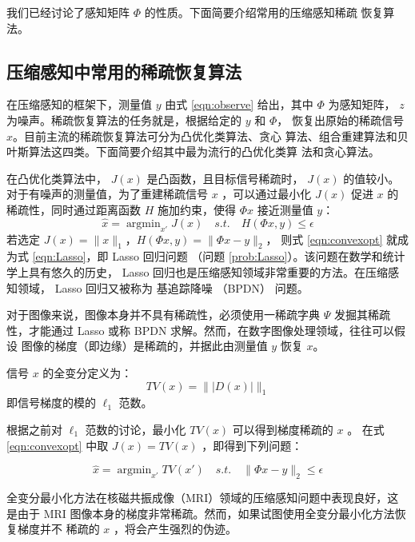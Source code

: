 我们已经讨论了感知矩阵 $\Phi$ 的性质。下面简要介绍常用的压缩感知稀疏
恢复算法。

\subsection{压缩感知中常用的稀疏恢复算法}

在压缩感知的框架下，测量值 $y$ 由式 \ref{eqn:observe} 给出，其中 $\Phi$
为感知矩阵， $z$ 为噪声。稀疏恢复算法的任务就是，根据给定的 $y$ 和 $\Phi$，
恢复出原始的稀疏信号 $x$。目前主流的稀疏恢复算法可分为凸优化类算法、贪心
算法、组合重建算法和贝叶斯算法这四类。下面简要介绍其中最为流行的凸优化类算
法和贪心算法。

在凸优化类算法中， $J(x)$ 是凸函数，且目标信号稀疏时， $J(x)$
的值较小。对于有噪声的测量值，为了重建稀疏信号 $x$ ，可以通过最小化 $J(x)$
促进 $x$ 的稀疏性，同时通过距离函数 $H$ 施加约束，使得 $\Phi x$ 接近测量值
$y$：
\begin{equation} \label{eqn:convexopt}
\hat x = \mathop{\arg \min}_{x'} J(x) \quad s.t. \quad H(\Phi x, y) \leq
\epsilon
\end{equation}
若选定 $J(x) = \|x\|_1$，$H(\Phi x, y) = \|\Phi x - y\|_2$，
则式 \ref{eqn:convexopt} 就成为式 \ref{eqn:Lasso}，即 Lasso 回归问题
（问题 \ref{prob:Lasso}）。该问题在数学和统计学上具有悠久的历史， Lasso
回归也是压缩感知领域非常重要的方法。在压缩感知领域， Lasso 回归又被称为
基追踪降噪 （BPDN） 问题。

对于图像来说，图像本身并不具有稀疏性，必须使用一稀疏字典 $\Psi$ 发掘其稀疏
性，才能通过 Lasso 或称 BPDN 求解。然而，在数字图像处理领域，往往可以假设
图像的梯度（即边缘）是稀疏的，并据此由测量值 $y$ 恢复 $x$。
\begin{definition} [全变分]
信号 $x$ 的全变分定义为：
\begin{equation}
TV(x) = \| |D(x)| \|_1
\end{equation}
即信号梯度的模的 $\ell_1$ 范数。
\end{definition}

根据之前对 $\ell_1$ 范数的讨论，最小化 $TV(x)$ 可以得到梯度稀疏的 $x$ 。
在式 \ref{eqn:convexopt} 中取 $J(x) = TV(x)$ ，即得到下列问题：
\begin{problem} \label{prob:TVopt}
\begin{equation}
\hat x = \mathop{\arg \min}_{x'} TV(x') \quad s.t. \quad 
\|\Phi x - y\|_2 \leq \epsilon
\end{equation}
\end{problem}
全变分最小化方法在核磁共振成像（MRI）领域的压缩感知问题中表现良好，这是由于
MRI 图像本身的梯度非常稀疏。然而，如果试图使用全变分最小化方法恢复梯度并不
稀疏的 $x$ ，将会产生强烈的伪迹。


